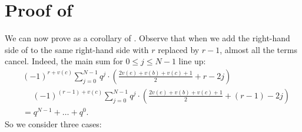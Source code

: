 \section{Proof of }
We can now prove 
as a corollary of .
Observe that when we add the right-hand side of 
to the same right-hand side with $r$ replaced by $r-1$, almost all the terms cancel.
Indeed, the main sum for $0 \le j \le N-1$ line up:
\begin{align*}
  &(-1)^{r+v(c)} \sum_{j=0}^{N-1} q^j \cdot \left( \frac{2v(e)+v(b)+v(c)+1}{2} + r - 2j \right) \\
  &\phantom+
  (-1)^{(r-1)+v(c)} \sum_{j=0}^{N-1} q^j \cdot \left( \frac{2v(e)+v(b)+v(c)+1}{2} + (r-1) - 2j \right) \\
  &= q^{N-1} + \dots + q^0.
\end{align*}
So we consider three cases:
